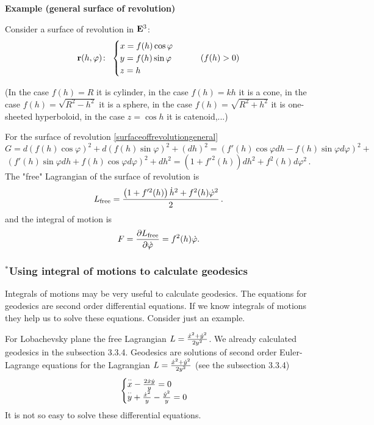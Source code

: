 \documentclass[12pt]{article}
\theoremstyle{theorem}
\numberwithin{equation}{section}
\begin{document}
{{\bf Example (general surface of revolution)}

Consider  a surface  of revolution in ${\bf E}^3$:
                   \begin{equation}\label{surfaceoffrevolutiongeneral}
                    {\bf r}(h,\varphi)\colon \,\,
                  \begin{cases}
                  x=f(h)\cos\varphi\cr
                  y=f(h)\sin\varphi\cr
                  z=h
                   \end{cases}\qquad
                   (f(h)>0)
                       \end{equation}

(In the case $f(h)=R$ it is cylinder, in the case $f(h)=kh$ it is a cone, in the case $f(h)=\sqrt{R^2-h^2}$
it is a sphere, in the case $f(h)=\sqrt {R^2+h^2}$ it is one-sheeted hyperboloid, in the case
$z=\cos h$ it is catenoid,...)

For the surface of revolution \eqref{surfaceoffrevolutiongeneral}
                   $$
          G=d(f(h)\cos\varphi)^2+d(f(h)\sin\varphi)^2+(dh)^2=
          (f'(h)\cos\varphi dh-f(h)\sin\varphi d\varphi)^2+
                   $$
                   $$
     (f'(h)\sin\varphi dh+f(h)\cos\varphi d\varphi)^2+dh^2=(1+f'^2(h))dh^2+f^2(h)d\varphi^2\,.
                   $$
The "free" Lagrangian of the surface of revolution is
                 $$
L_{\rm free}={\left(1+f'^2(h)\right)\dot h^2+f^2(h)\dot\varphi^2\over 2}\,.
                  $$
and the integral of motion is
                 $$
           F={\partial L_{\rm free}\over \partial \dot\varphi}=f^2(h)\dot\varphi.
                 $$



\subsubsection {$^*$Using integral of  motions to calculate geodesics}

  Integrals of motions may be very useful to calculate geodesics.
  The equations for geodesics are second order differential equations.  If we know integrals of motions
  they help us to solve these equations.  Consider just an example.

    For Lobachevsky plane the free Lagrangian $L={\dot x^2+\dot y^2\over 2y^2}$. We already
    calculated geodesics in the subsection 3.3.4. Geodesics are solutions of second order Euler-Lagrange equations for
    the Lagrangian $L={\dot x^2+\dot y^2\over 2y^2}$ (see the subsection 3.3.4)
             $$
             \begin{cases}
    {\buildrel \cdot\cdot\over x}-{2\dot x\dot y\over y}=0\cr
    {\buildrel \cdot\cdot\over y}+{\dot x^2\over y}-{\dot y^2\over y}=0\cr
    \end{cases}
                          $$
  It is not so easy to solve these differential equations.

}
\end{document}

